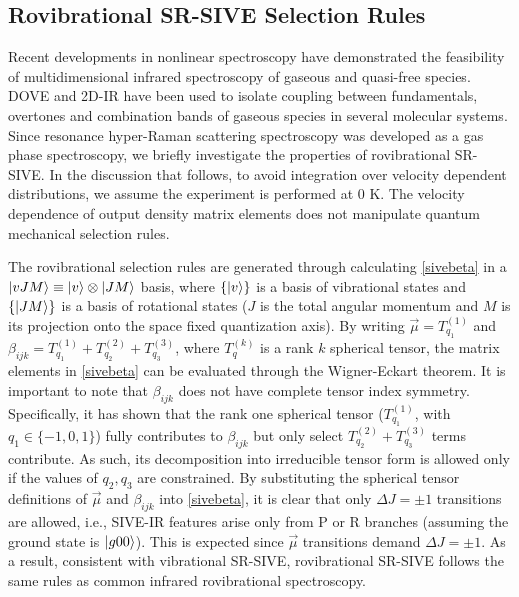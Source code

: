 \documentclass[aip, jcp, draft, onecolumn]{revtex4-2}
\begin{document}
\subsection{Rovibrational SR-SIVE Selection Rules} %
Recent developments in nonlinear spectroscopy have demonstrated the feasibility of multidimensional infrared spectroscopy of gaseous and quasi-free species. \cite{Ziegler2018, Gronborg2022, RN325, Chen2024}
DOVE and 2D-IR have been used to isolate coupling between fundamentals, overtones and combination bands of gaseous species in several molecular systems. 
Since resonance hyper-Raman scattering spectroscopy was developed as a gas phase spectroscopy,\cite{RN515} we briefly investigate the properties of rovibrational SR-SIVE.
In the discussion that follows, to avoid integration over velocity dependent distributions, we assume the experiment is performed at 0 K.
The velocity dependence of output density matrix elements does not manipulate quantum mechanical selection rules. \cite{Bracamonte2003}

The rovibrational selection rules are generated through calculating \autoref{sivebeta} in a $\ket{vJM} \equiv \ket{v} \otimes {\ket{JM}}$ basis, where $\{\ket{v}\}$ is a basis of vibrational states and $\{\ket{JM}\}$ is a basis of rotational states ($J$ is the total angular momentum and $M$ is its projection onto the space fixed quantization axis).
By writing $\vec{\mu} = T_{q_1}^{(1)}$ and $\beta_{ijk} = T_{q_1}^{(1)} + T_{q_2}^{(2)} + T_{q_3}^{(3)}$, where $T^{(k)}_{q}$ is a rank $k$ spherical tensor, the matrix elements in \autoref{sivebeta} can be evaluated through the Wigner-Eckart theorem.
It is important to note that $\beta_{ijk}$ does not have complete tensor index symmetry.\cite{Andrews1978}
Specifically, it has shown that the rank one spherical tensor ($T_{q_1}^{(1)}$, with $q_1 \in \{-1, 0 ,1\}$) fully contributes to $\beta_{ijk}$ but only select $T_{q_2}^{(2)} + T_{q_3}^{(3)}$ terms contribute. \cite{Andrews1978, Andrews1990}
As such, its decomposition into irreducible tensor form is allowed only if the values of $q_2, q_3$ are constrained.
By substituting the spherical tensor definitions of $\vec{\mu}$ and $\beta_{ijk}$ into \autoref{sivebeta}, it is clear that only $\Delta J = \pm 1$ transitions are allowed, i.e., SIVE-IR features arise only from P or R branches (assuming the ground state is $\ket{g00}$).
This is expected since $\vec{\mu}$ transitions demand $\Delta J = \pm 1$.
As a result, consistent with vibrational SR-SIVE, rovibrational SR-SIVE follows the same rules as common infrared rovibrational spectroscopy.
\end{document}
